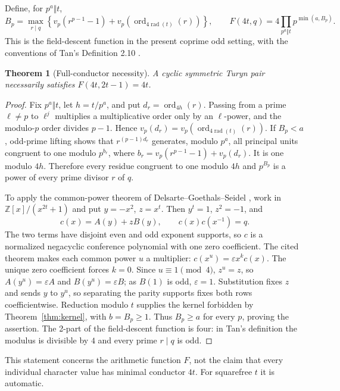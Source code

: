 \documentclass[11pt]{article}
\newtheorem{theorem}{Theorem}[section]
\theoremstyle{definition}
\theoremstyle{remark}
\begin{document}
Define, for $p^a\Vert t$,
\[
 B_p=\max_{r\mid q}\left\{v_p(r^{p-1}-1)
              +v_p(\operatorname{ord}_{4\operatorname{rad}(t)}(r))\right\},
 \qquad F(4t,q)=4\prod_{p^a\Vert t}p^{\min(a,B_p)}.
\]
This is the field-descent function in the present coprime odd setting,
with the conventions of Tan's Definition 2.10 \cite{Tan18}.
\begin{theorem}[Full-conductor necessity]\label{thm:fc}
A cyclic symmetric Turyn pair necessarily satisfies $F(4t,2t-1)=4t$.
\end{theorem}
\begin{proof}
Fix $p^a\Vert t$, let $h=t/p^a$, and put $d_r=\operatorname{ord}_{4h}(r)$.
Passing from a prime $\ell\ne p$ to $\ell^j$ multiplies a multiplicative
order only by an $\ell$-power, and the modulo-$p$ order divides $p-1$.
Hence $v_p(d_r)=v_p(\operatorname{ord}_{4\operatorname{rad}(t)}(r))$.
If $B_p<a$, odd-prime lifting shows that $r^{(p-1)d_r}$ generates, modulo
$p^a$, all principal units congruent to one modulo $p^{b_r}$, where
$b_r=v_p(r^{p-1}-1)+v_p(d_r)$. It is one modulo $4h$. Therefore every
residue congruent to one modulo $4h$ and $p^{B_p}$ is a power of every
prime divisor $r$ of $q$.

To apply the common-power theorem of Delsarte--Goethals--Seidel
\cite[Theorems~5.2--5.4]{DGS71}, work in
$\mathbb Z[x]/(x^{2t}+1)$ and put $y=-x^2$, $z=x^t$. Then $y^t=1$,
$z^2=-1$, and
\[
 c(x)=A(y)+zB(y),\qquad c(x)c(x^{-1})=q.
\]
The two terms have disjoint even and odd exponent supports, so $c$ is a
normalized negacyclic conference polynomial with one zero coefficient.
The cited theorem makes each common power $u$ a multiplier:
$c(x^u)=\varepsilon x^{k}c(x)$. The unique zero coefficient forces $k=0$.
Since $u\equiv1\pmod4$, $z^u=z$, so $A(y^u)=\varepsilon A$ and
$B(y^u)=\varepsilon B$; as $B(1)$ is odd, $\varepsilon=1$. Substitution
fixes $z$ and sends $y$ to $y^u$, so separating the parity supports
fixes both rows coefficientwise. Reduction modulo $t$ supplies the kernel
forbidden by Theorem~\ref{thm:kernel}, with $b=B_p\ge1$.
Thus $B_p\ge a$ for every $p$, proving the assertion. The 2-part of the
field-descent function is four: in Tan's definition the modulus is
divisible by $4$ and every prime $r\mid q$ is odd.
\end{proof}
This statement concerns the arithmetic function $F$, not the claim that
every individual character value has minimal conductor $4t$. For
squarefree $t$ it is automatic.
\end{document}
